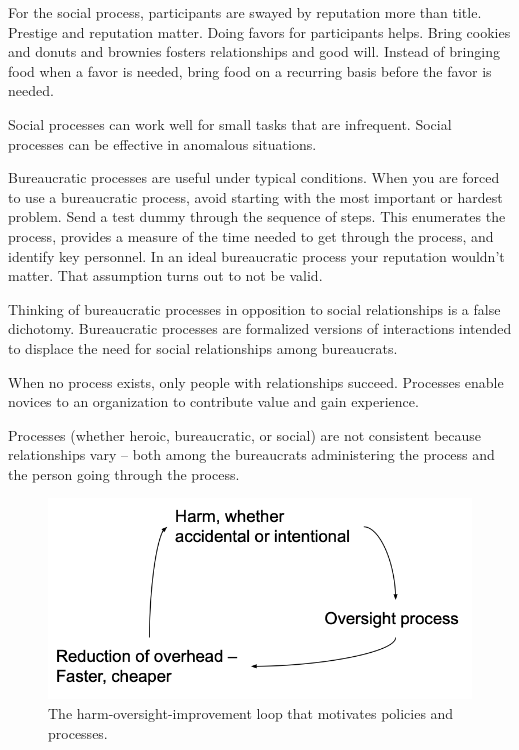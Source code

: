 For the social process, participants are swayed by reputation more than title. Prestige and reputation matter. Doing favors for participants helps. Bring cookies and donuts and brownies fosters relationships and good will. 
Instead of bringing food when a favor is needed, bring food on a recurring basis before the favor is needed.

Social processes can work well for small tasks that are infrequent.
Social processes can be effective in anomalous situations.

Bureaucratic processes are useful under typical conditions.
When you are forced to use a bureaucratic process, avoid starting with the most important or hardest problem. Send a test dummy through the sequence of steps. This enumerates the process, provides a measure of the time needed to get through the process, and identify key personnel. In an ideal bureaucratic process your reputation wouldn't matter. That assumption turns out to not be valid. 

Thinking of bureaucratic processes in opposition to social relationships is a false dichotomy. Bureaucratic processes are formalized versions of interactions intended to displace the need for social relationships among bureaucrats.



When no process exists, only people with relationships succeed. Processes enable novices to an organization to contribute value and gain experience. 



Processes (whether heroic, bureaucratic, or social) are not consistent because relationships vary -- both among the bureaucrats administering the process and the person going through the process.






\begin{figure}
    \centering
    \includegraphics{images/process_loop_harm-oversight-improvement}
    \caption{The harm-oversight-improvement loop that motivates policies and processes.}
    \label{fig:harm-oversight-improvement}
\end{figure}










